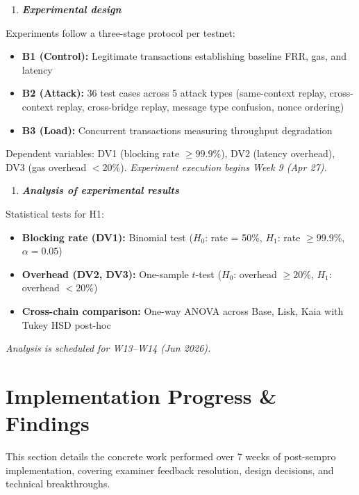 \documentclass[
]{article}
\begin{document}
\bigskip
\begin{enumerate}
\def\labelenumi{\arabic{enumi}.}
\setcounter{enumi}{2}
\item
  \emph{\textbf{Experimental design}}
\end{enumerate}

Experiments follow a three-stage protocol per testnet:
\begin{itemize}
  \item \textbf{B1 (Control):} Legitimate transactions establishing baseline FRR, gas, and latency
  \item \textbf{B2 (Attack):} 36 test cases across 5 attack types (same-context replay, cross-context replay, cross-bridge replay, message type confusion, nonce ordering)
  \item \textbf{B3 (Load):} Concurrent transactions measuring throughput degradation
\end{itemize}
Dependent variables: DV1 (blocking rate $\geq 99.9\%$), DV2 (latency overhead), DV3 (gas overhead $<20\%$). \textit{Experiment execution begins Week 9 (Apr 27).}

\bigskip
\begin{enumerate}
\def\labelenumi{\arabic{enumi}.}
\setcounter{enumi}{3}
\item
  \emph{\textbf{Analysis of experimental results}}
\end{enumerate}

Statistical tests for H1:
\begin{itemize}
  \item \textbf{Blocking rate (DV1):} Binomial test ($H_0$: rate = 50\%, $H_1$: rate $\geq 99.9\%$, $\alpha = 0.05$)
  \item \textbf{Overhead (DV2, DV3):} One-sample $t$-test ($H_0$: overhead $\geq 20\%$, $H_1$: overhead $< 20\%$)
  \item \textbf{Cross-chain comparison:} One-way ANOVA across Base, Lisk, Kaia with Tukey HSD post-hoc
\end{itemize}
\textit{Analysis is scheduled for W13--W14 (Jun 2026).}

\section{Implementation Progress \& Findings}

This section details the concrete work performed over 7 weeks of post-sempro implementation, covering examiner feedback resolution, design decisions, and technical breakthroughs.
\end{document}
